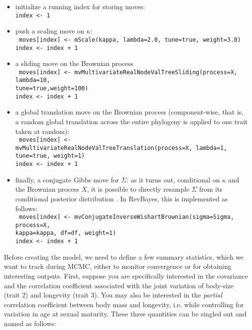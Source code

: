 \documentclass[usletter]{article}
\newcommand{\cmd}[1]{\texttt{#1}}
\begin{document}
\begin{itemize}
\item
initialize a running index for storing moves:
\\
\cmd{index <- 1}
\item
push a scaling move on $\kappa$:
\\
\cmd{
moves[index] <- mScale(kappa, lambda=2.0, tune=true, weight=3.0)
\\
index <- index + 1
}
\item
a sliding move on the Brownian process
\\
\cmd{
moves[index] <- mvMultivariateRealNodeValTreeSliding(process=X, lambda=10,
\\
tune=true,weight=100)
\\
index <- index + 1
}
\item
a global translation move on the Brownian process (component-wise, that is, a random global translation across the entire phylogeny is applied to one trait taken at random):
\\
\cmd{
moves[index] <- mvMultivariateRealNodeValTreeTranslation(process=X, lambda=1,
\\
tune=true, weight=1)
\\
index <- index + 1
}
\item
finally, a conjugate Gibbs move for $\Sigma$: as it turns out, conditional on $\kappa$ and the Brownian process $X$, it is possible to directly resample $\Sigma$ from its conditional posterior distribution \citep{Lartillot:2011p55}. In RevBayes, this is implemented as follows:
\\
\cmd{
moves[index] <- mvConjugateInverseWishartBrownian(sigma=Sigma, process=X,
\\
kappa=kappa, df=df, weight=1)
\\
index <- index + 1
}
\end{itemize}
Before creating the model, we need to define a few summary statistics, which we want to track during MCMC, either to monitor convergence or for obtaining interesting outputs.
First, suppose you are specifically interested in the covariance and the correlation coefficient associated with the joint variation of body-size (trait 2) and longevity (trait 3). You may also be interested in the \emph{partial} correlation coefficient between body mass and longevity, i.e. while controlling for variation in age at sexual maturity. These three quantities can be singled out and named as follows:
\end{document}
